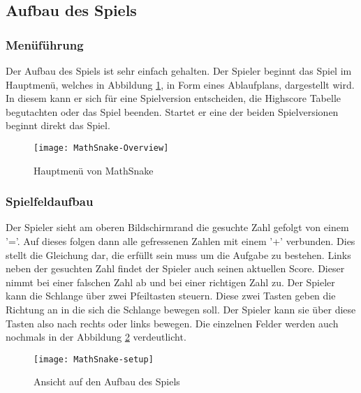 \subsection{Aufbau des Spiels}
\subsubsection{Menüführung}
Der Aufbau des Spiels ist sehr einfach gehalten. Der Spieler beginnt das Spiel im Hauptmenü, welches in Abbildung \ref{fig:mathsnake-menu}, in Form eines Ablaufplans, dargestellt wird. In diesem kann er sich für eine Spielversion entscheiden, die Highscore Tabelle begutachten oder das Spiel beenden. Startet er eine der beiden Spielversionen beginnt direkt das Spiel. 
\begin{figure}[htb]
	\centering
	\texttt{[image: MathSnake-Overview]}
	\caption{Hauptmenü von MathSnake\label{fig:mathsnake-menu}}
\end{figure}
\subsubsection{Spielfeldaufbau}
Der Spieler sieht am oberen Bildschirmrand die gesuchte Zahl gefolgt von einem '='. Auf dieses folgen dann alle gefressenen Zahlen mit einem '+' verbunden. Dies stellt die Gleichung dar, die erfüllt sein muss um die Aufgabe zu bestehen. Links neben der gesuchten Zahl findet der Spieler auch seinen aktuellen Score. Dieser nimmt bei einer falschen Zahl ab und bei einer richtigen Zahl zu. Der Spieler kann die Schlange über zwei Pfeiltasten steuern. Diese zwei Tasten geben die Richtung an in die sich die Schlange bewegen soll. Der Spieler kann sie über diese Tasten also nach rechts oder links bewegen. Die einzelnen Felder werden auch nochmals in der Abbildung \ref{fig:mathsnake-setup} verdeutlicht.
\begin{figure}[htb]
	\centering
	\texttt{[image: MathSnake-setup]}
	\caption{Ansicht auf den Aufbau des Spiels\label{fig:mathsnake-setup}}
\end{figure}
